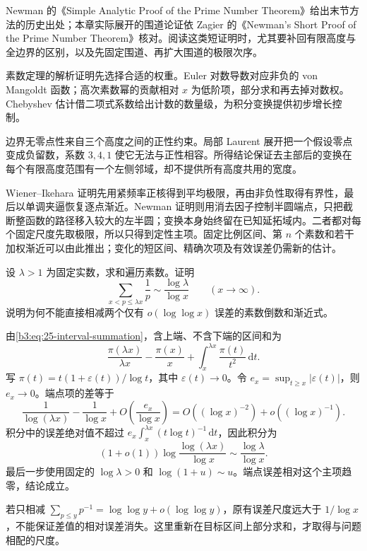 Newman 的《Simple Analytic Proof of the Prime Number Theorem》\cite{Newman1980Simple}给出末节方法的历史出处；本章实际展开的围道论证依 Zagier 的《Newman's Short Proof of the Prime Number Theorem》\cite[pp. 706--708]{Zagier1997Newman}核对。阅读这类短证明时，尤其要补回有限高度与全边界的区别，以及先固定围道、再扩大围道的极限次序。








\begin{chaptersummary}
素数定理的解析证明先选择合适的权重。Euler 对数导数对应非负的 von Mangoldt 函数；高次素数幂的贡献相对 \(x\) 为低阶项，部分求和再去掉对数权。Chebyshev 估计借二项式系数给出计数的数量级，为积分变换提供初步增长控制。

边界无零点性来自三个高度之间的正性约束。局部 Laurent 展开把一个假设零点变成负留数，系数 \(3,4,1\) 使它无法与正性相容。所得结论保证去主部后的变换在每个有限高度范围有一个左侧邻域，却不提供所有高度共用的宽度。

Wiener--Ikehara 证明先用紧频率正核得到平均极限，再由非负性取得有界性，最后以单调夹逼恢复逐点渐近。Newman 证明则用消去因子控制半圆端点，只把截断整函数的路径移入较大的左半圆；变换本身始终留在已知延拓域内。二者都对每个固定尺度先取极限，所以只得到定性主项。固定比例区间、第 \(n\) 个素数和若干加权渐近可以由此推出；变化的短区间、精确次项及有效误差仍需新的估计。
\end{chaptersummary}

\BookExercises


\begin{exercise}\label{b3:ex:27-1}
设 \(\lambda>1\) 为固定实数，求和遍历素数。证明
\[
 \sum_{x<p\le\lambda x}\frac1p
       \sim\frac{\log\lambda}{\log x}\qquad(x\to\infty).
\]
说明为何不能直接相减两个仅有 \(o(\log\log x)\) 误差的素数倒数和渐近式。
\end{exercise}
\begin{solution}
由\eqref{b3:eq:25-interval-summation}，含上端、不含下端的区间和为
\[
 \frac{\pi(\lambda x)}{\lambda x}-\frac{\pi(x)}x
       +\int_x^{\lambda x}\frac{\pi(t)}{t^2}\,\mathrm dt.
\]
写 \(\pi(t)=t(1+\varepsilon(t))/\log t\)，其中 \(\varepsilon(t)\to0\)。令
\(e_x=\sup_{t\ge x}|\varepsilon(t)|\)，则 \(e_x\to0\)。端点项的差等于
\[
 \frac1{\log(\lambda x)}-\frac1{\log x}
       +O\!\left(\frac{e_x}{\log x}\right)
 =O((\log x)^{-2})+o((\log x)^{-1}).
\]
积分中的误差绝对值不超过
\(e_x\int_x^{\lambda x}(t\log t)^{-1}\,\mathrm dt\)，因此积分为
\[
 (1+o(1))\log\frac{\log(\lambda x)}{\log x}
       \sim\frac{\log\lambda}{\log x}.
\]
最后一步使用固定的 \(\log\lambda>0\) 和 \(\log(1+u)\sim u\)。端点误差相对这个主项趋零，结论成立。

若只相减 \(\sum_{p\le y}p^{-1}=\log\log y+o(\log\log y)\)，原有误差尺度远大于 \(1/\log x\)，不能保证差值的相对误差消失。这里重新在目标区间上部分求和，才取得与问题相配的尺度。
\end{solution}

